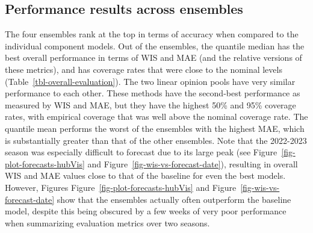 \documentclass[
]{article}
\begin{document}
\subsection{Performance results across
ensembles}\label{performance-results-across-ensembles}

The four ensembles rank at the top in terms of accuracy when compared to
the individual component models. Out of the ensembles, the quantile
median has the best overall performance in terms of WIS and MAE (and the
relative versions of these metrics), and has coverage rates that were
close to the nominal levels (Table~\ref{tbl-overall-evaluation}). The
two linear opinion pools have very similar performance to each other.
These methods have the second-best performance as measured by WIS and
MAE, but they have the highest 50\% and 95\% coverage rates, with
empirical coverage that was well above the nominal coverage rate. The
quantile mean performs the worst of the ensembles with the highest MAE,
which is substantially greater than that of the other ensembles. Note
that the 2022-2023 season was especially difficult to forecast due to
its large peak (see Figure~\ref{fig-plot-forecasts-hubVis} and
Figure~\ref{fig-wis-vs-forecast-date}), resulting in overall WIS and MAE
values close to that of the baseline for even the best models. However,
Figures Figure~\ref{fig-plot-forecasts-hubVis} and
Figure~\ref{fig-wis-vs-forecast-date} show that the ensembles actually
often outperform the baseline model, despite this being obscured by a
few weeks of very poor performance when summarizing evaluation metrics
over two seasons.
\end{document}
